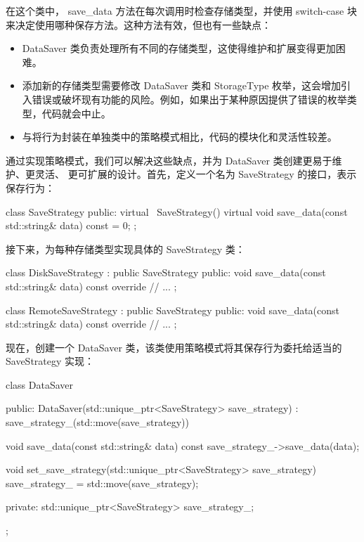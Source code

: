 在这个类中， save\_data 方法在每次调用时检查存储类型，并使用 switch-case 块来决定使用哪种保存方法。这种方法有效，但也有一些缺点：

\begin{itemize}
\item
DataSaver 类负责处理所有不同的存储类型，这使得维护和扩展变得更加困难。

\item
添加新的存储类型需要修改 DataSaver 类和 StorageType 枚举，这会增加引入错误或破坏现有功能的风险。例如，如果出于某种原因提供了错误的枚举类型，代码就会中止。

\item
与将行为封装在单独类中的策略模式相比，代码的模块化和灵活性较差。
\end{itemize}

通过实现策略模式，我们可以解决这些缺点，并为 DataSaver 类创建更易于维护、更灵活、 更可扩展的设计。首先，定义一个名为 SaveStrategy 的接口，表示保存行为：

\begin{cpp}
class SaveStrategy {
public:
    virtual ~SaveStrategy() {}
    virtual void save_data(const std::string& data) const = 0;
};
\end{cpp}

接下来，为每种存储类型实现具体的 SaveStrategy 类：

\begin{cpp}
class DiskSaveStrategy : public SaveStrategy {
    public:
    void save_data(const std::string& data) const override {
        // ...
    }
};

class RemoteSaveStrategy : public SaveStrategy {
    public:
    void save_data(const std::string& data) const override {
        // ...
    }
};
\end{cpp}

现在，创建一个 DataSaver 类，该类使用策略模式将其保存行为委托给适当的 SaveStrategy 实现：

\begin{cpp}
class DataSaver {
public:
    DataSaver(std::unique_ptr<SaveStrategy> save_strategy)
     : save_strategy_(std::move(save_strategy)) {}

    void save_data(const std::string& data) const {
        save_strategy_->save_data(data);
    }

    void set_save_strategy(std::unique_ptr<SaveStrategy> save_strategy) {
        save_strategy_ = std::move(save_strategy);
    }

private:
    std::unique_ptr<SaveStrategy> save_strategy_;
};
\end{cpp}

